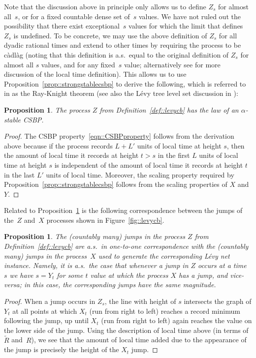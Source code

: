 \documentclass[JEP,XML,SOM,Unicode]{cedram}
\theoremstyle{plain}
\numberwithin{theorem}{section}
\newtheorem{proposition}[theorem]{Proposition}
\theoremstyle{definition}
\newcommand{\cadlag}{càdlàg}
\let\wt\widetilde
\begin{document}
Note that the discussion above in principle only allows us to define $Z_s$ for almost all~$s$, or for a fixed countable dense set of~$s$ values. We have not ruled out the possibility that there exist exceptional~$s$ values for which the limit that defines $Z_s$ is undefined. To be concrete, we may use the above definition of $Z_s$ for all dyadic rational times and extend to other times by requiring the process to be {\cadlag} (noting that this definition is a.s.\ equal to the original definition of $Z_s$ for almost all $s$ values, and for any fixed~$s$ value; alternatively see \cite{duquesnelegall2005levytrees} for more discussion of the local time definition). This allows us to use Proposition~\ref{prop::strongstablecsbp} to derive the following, which is referred to in \cite[Th.\,1.4.1]{duquesnelegall2005levytrees} as the Ray-Knight theorem (see also the Lévy tree level set discussion in \cite{dlg2002trees_levy, duquesnelegall2005levytrees}):

\begin{proposition}
\label{prop::Zisalphastable}
The process $Z$ from Definition~\ref{def::levycb} has the law of an $\alpha$-stable CSBP.
\end{proposition}
\begin{proof}
The CSBP property~\eqref{eqn::CSBPproperty} follows from the derivation above because if the process records $L+L'$ units of local time at height $s$, then the amount of local time it records at height $t > s$ in the first $L$ units of local time at height $s$ is independent of the amount of local time it records at height $t$ in the last $L'$ units of local time. Moreover, the scaling property required by Proposition~\ref{prop::strongstablecsbp} follows from the scaling properties of $X$ and $Y$.
\end{proof}

Related to Proposition~\ref{prop::Zisalphastable} is the following correspondence between the jumps of the~$Z$ and~$X$ processes shown in Figure~\ref{fig::levycb}.

\begin{proposition}
\label{prop::jump_correspondence}
The (countably many) jumps in the process $Z$ from Definition~\ref{def::levycb} are a.s.\ in one-to-one correspondence with the (countably many) jumps in the process~$X$ used to generate the corresponding Lévy net instance. Namely, it is a.s.\ the case that whenever a jump in $Z$ occurs at a time $s$ we have $s = Y_t$ for some $t$ value at which the process $X$ has a jump, and vice-versa; in this case, the corresponding jumps have the same magnitude.
\end{proposition}
\begin{proof}
When a jump occurs in $Z_s$, the line with height of $s$ intersects the graph of $Y_t$ at all points at which $X_t$ (run from right to left) reaches a record minimum following the jump, up until $X_t$ (run from right to left) again reaches the value on the lower side of the jump. Using the description of local time above (in terms of~$\wt R$ and~$R$), we see that the amount of local time added due to the appearance of the jump is precisely the height of the $X_t$ jump.
\end{proof}
\end{document}
